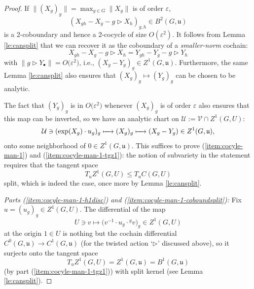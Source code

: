 \documentclass[11pt]{article}
\numberwithin{equation}{section}
\numberwithin{equation}{section}
\newcommand\cU{{\mathcal U}}
\newcommand\cV{{\mathcal V}}
\newcommand\fu{{\mathfrak u}}
\begin{document}
\begin{proof}
 If $\|(X_g)_g\| = \max_{g\in G} \|X_g\|$ is of order $\varepsilon$,
 \begin{equation*}
 \left(X_{gh} - X_g - g\triangleright X_h\right)_{g,h}\in B^2(G,\fu)
 \end{equation*}
 is a 2-coboundary and hence a 2-cocycle of size $O(\varepsilon^2)$. It follows from Lemma \ref{le:cansplit} that we can recover it as the coboundary of a {\it smaller-norm} cochain:
 \begin{equation*}
 X_{gh} - X_g - g\triangleright X_h
 =
 Y_{gh} - Y_g - g\triangleright Y_h
 \end{equation*}
 with $\|g\triangleright Y_{\bullet}\|=O\big(\varepsilon^2\big)$, i.e., $(X_g-Y_g)_g\in Z^1(G,\fu)$.
 Furthermore, the same Lemma \ref{le:cansplit} also ensures that $(X_g)_g\mapsto (Y_g)_g$ can be chosen to be analytic.

 The fact that $(Y_g)_g$ is in $O\big(\varepsilon^2\big)$ whenever $(X_g)_g$ is of order $\varepsilon$ also ensures that this map can be inverted, so we have an analytic chart on $\cU:=\cV\cap Z^1(G,U)$:
 \begin{equation*}
 \cU\ni (\exp(X_g)\cdot u_g)_g
 \xmapsto{\quad}
 (X_g)_g
 \xmapsto{\quad}
 (X_g-Y_g)\in Z^1(G,\fu),
 \end{equation*}
 onto some neighborhood of $0\in Z^1(G,\fu)$. This suffices to prove (\ref{item:cocyle-man-1}) and (\ref{item:cocyle-man-1-tgz1}): the notion of subvariety in the statement requires that the tangent space
 \begin{equation*}
 T_u Z^1(G,U)\le T_u C(G,U)
 \end{equation*}
 split, which is indeed the case, once more by Lemma \ref{le:cansplit}.

\emph{ Parts {\rm(\ref{item:cocyle-man-1-h1disc})} and {\rm(\ref{item:cocyle-man-1-coboundsplit})}:} Fix $u=(u_g)_g\in Z^1(G,U)$.
 The differential of the map
 \begin{equation}\label{eq:noncommdiff}
 U\ni v\mapsto \big(v^{-1}\cdot u_g\cdot {}^g v\big)_g\in Z^1(G,U)
 \end{equation}
 at the origin $1\in U$ is nothing but the cochain differential $C^0(G,\fu)\to C^1(G,\fu)$ (for the twisted action `$\triangleright$' discussed above), so it surjects onto the tangent space
 \begin{equation*}
 T_u Z^1(G,U) = Z^1(G,\fu) = B^1(G,\fu)
 \end{equation*}
 (by part (\ref{item:cocyle-man-1-tgz1})) with split kernel (see Lemma \ref{le:cansplit}).


\end{proof}
\end{document}
